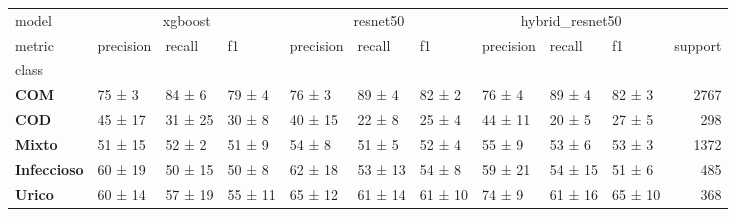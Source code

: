 \begin{tabular}{llllllllllr}
\toprule
model & \multicolumn{3}{c}{xgboost} & \multicolumn{3}{c}{resnet50} & \multicolumn{3}{c}{hybrid_resnet50} &  \\
metric & precision & recall & f1 & precision & recall & f1 & precision & recall & f1 & support \\
class &  &  &  &  &  &  &  &  &  &  \\
\midrule
\textbf{COM} & 75 ± 3 & 84 ± 6 & 79 ± 4 & 76 ± 3 & 89 ± 4 & 82 ± 2 & 76 ± 4 & 89 ± 4 & 82 ± 3 & 2767 \\
\textbf{COD} & 45 ± 17 & 31 ± 25 & 30 ± 8 & 40 ± 15 & 22 ± 8 & 25 ± 4 & 44 ± 11 & 20 ± 5 & 27 ± 5 & 298 \\
\textbf{Mixto} & 51 ± 15 & 52 ± 2 & 51 ± 9 & 54 ± 8 & 51 ± 5 & 52 ± 4 & 55 ± 9 & 53 ± 6 & 53 ± 3 & 1372 \\
\textbf{Infeccioso} & 60 ± 19 & 50 ± 15 & 50 ± 8 & 62 ± 18 & 53 ± 13 & 54 ± 8 & 59 ± 21 & 54 ± 15 & 51 ± 6 & 485 \\
\textbf{Urico} & 60 ± 14 & 57 ± 19 & 55 ± 11 & 65 ± 12 & 61 ± 14 & 61 ± 10 & 74 ± 9 & 61 ± 16 & 65 ± 10 & 368 \\
\bottomrule
\end{tabular}
